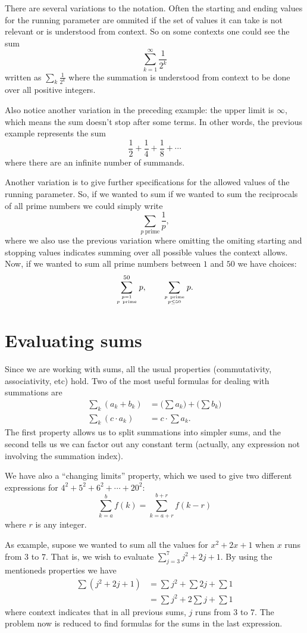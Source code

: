 \documentclass[12pt]{article}
\begin{document}
There are several variations to the notation. Often the starting and ending values for the running parameter are ommited if the set of values it can take is not relevant or is understood from context. So on some contexts one could see the sum
\[\sum_{k=1}^\infty \frac{1}{2^k}\]
written as $\sum_k \frac{1}{2^k}$ where the summation is understood from context to be done over all positive integers.

Also notice another variation in the preceding example: the upper limit is $\infty$, which means the sum doesn't stop after some terms. In other words, the previous example represents the sum
\[\frac12+\frac14+\frac18+\cdots \]
where there are an infinite number of summands.

Another variation is to give further specifications for the allowed values of the running parameter. So, if we wanted to sum if we wanted to sum the reciprocals of all prime numbers we could simply write
\[
\sum_{p\ \mathrm{prime}}\frac{1}{p},
\]
where we also use the previous variation where omitting the omiting starting and stopping values indicates summing over all possible values the context allows. Now, if we wanted to sum all prime numbers between $1$ and $50$ we have choices:
\[
\sum_{p=1\atop p\ \mathrm{prime}}^{50} p, \qquad\sum_{p\ \mathrm{prime}\atop p\leq 50}p.
\]

\section*{Evaluating sums}
Since we are working with sums, all the usual properties (commutativity, associativity, etc) hold. 
Two of the most useful formulas for dealing with summations are
\begin{align}
\sum_k (a_k+b_k) &= \Big(\sum a_k \Big)+\Big(\sum b_k \Big)\\
\sum_k (c\cdot a_k) &= c\cdot\sum a_k .
\end{align}
The first property allows us to split summations into simpler sums, and the second tells us we can factor out any constant term (actually, any expression not involving the summation index).

We have also a ``changing limits'' property, which we used to give two different expressions for $4^2 + 5^2 + 6^2 + \cdots + 20^2$:
\begin{equation}
\sum_{k=a}^b f(k) = \sum_{k=a+r}^{b+r} f(k-r)
\end{equation}
where $r$ is any integer.

As example, supose we wanted to sum all the values for $x^2 + 2x + 1$ when $x$ runs from $3$ to $7$. That is, we wish to evaluate $\sum_{j=3}^7 j^2 + 2j + 1$.
By using the mentioneds properties we have
\begin{align*}
\sum (j^2+2j+1) &=\sum j^2 + \sum 2j + \sum 1\\
&=\sum j^2 + 2\sum j + \sum 1
\end{align*}
where context indicates that in all previous sums, $j$ runs from $3$ to $7$. The problem now is reduced to find formulas for the sums in the last expression. 
\end{document}
